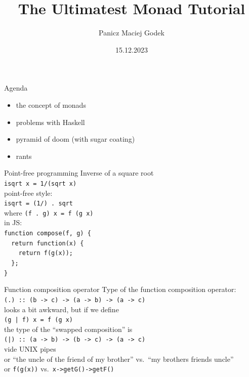 \documentclass{beamer}
\title{\textbf{The Ultimatest Monad Tutorial}}
\author{Panicz Maciej Godek}
\institute{
  \tiny{\href{mailto:godek.maciek@gmail.com}{\textbf{godek.maciek@gmail.com}}}
}
\date{15.12.2023}
\begin{document}
\begin{frame}
  \titlepage
\end{frame}

\begin{frame}{Agenda}
  \begin{itemize}
    \pause \item the concept of monads
    \pause \item problems with Haskell
    \pause \item pyramid of doom (with sugar coating)
    \pause \item rants
  \end{itemize}
\end{frame}

\begin{frame}{Point-free programming}
  Inverse of a square root \\ \pause
  \texttt{isqrt x = 1/(sqrt x)} \\ \pause
  point-free style: \\ \pause
  \texttt{isqrt = (1/) .\ sqrt} \\ \pause
  where
  \texttt{(f .\ g) x = f (g x)} \\ \pause
  in JS: \\
  \texttt{function compose(f, g) \{ \\
    \ \ return function(x) \{ \\
    \ \ \ \ return f(g(x)); \\
    \ \ \}; \\
    \}}  
\end{frame}

\begin{frame}{Function composition operator}
  Type of the function composition operator: \\ \pause
  \texttt{(.) :: (b -> c) -> (a -> b) -> (a -> c)} \\ \pause
  looks a bit awkward, but if we define \\
  \texttt{(g | f) x = f (g x)} \\ \pause
  the type of the ``swapped composition'' is \\ \pause
  \texttt{(|) :: (a -> b) -> (b -> c) -> (a -> c)} \\ \pause
  vide UNIX pipes \\ \pause
  or ``the uncle of the friend of my brother'' vs.\ ``my brother\textquotesingle s friend\textquotesingle s uncle'' \\ \pause
  or \texttt{f(g(x))} vs.\ \texttt{x->getG()->getF()}
\end{frame}
\end{document}
